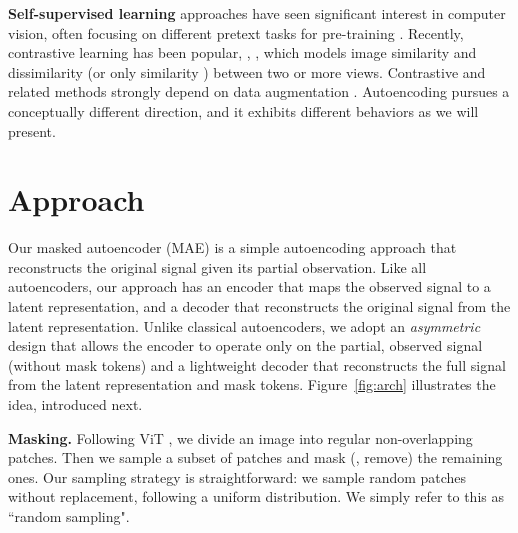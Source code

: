 \documentclass[10pt,twocolumn,letterpaper]{article}
\renewcommand{\paragraph}[1]{\vspace{1.25mm}\noindent\textbf{#1}}
\begin{document}
\paragraph{Self-supervised learning} approaches have seen significant interest in computer vision, often focusing on different pretext tasks for pre-training \cite{Doersch2015, Wang2015a, Noroozi2016, Zhang2016, Pathak2017, Gidaris2018}. Recently, contrastive learning \cite{Becker1992, Hadsell2006} has been popular, \eg, \cite{Wu2018a, Oord2018, He2020, Chen2020}, which models image similarity and dissimilarity (or only similarity \cite{Grill2020, Chen2021}) between two or more views. Contrastive and related methods strongly depend on data augmentation \cite{Chen2020, Grill2020, Chen2021}. Autoencoding pursues a conceptually different direction, and it exhibits different behaviors as we will present.

\vspace{1mm}\section{Approach}\vspace{0.5mm}
\label{sec:approach}

Our masked autoencoder (MAE) is a simple autoencoding approach that reconstructs the original signal given its partial observation. Like all autoencoders, our approach has an encoder that maps the observed signal to a latent representation, and a decoder that reconstructs the original signal from the latent representation. Unlike classical autoencoders, we adopt an \emph{asymmetric} design that allows the encoder to operate only on the partial, observed signal (without mask tokens) and a lightweight decoder that reconstructs the full signal from the latent representation and mask tokens. Figure~\ref{fig:arch} illustrates the idea, introduced next.

\paragraph{Masking.} Following ViT \cite{Dosovitskiy2021}, we divide an image into regular non-overlapping patches. Then we sample a subset of patches and mask (\ie, remove) the remaining ones. Our sampling strategy is straightforward: we sample random patches without replacement, following a uniform distribution. We simply refer to this as ``random sampling".
\end{document}
